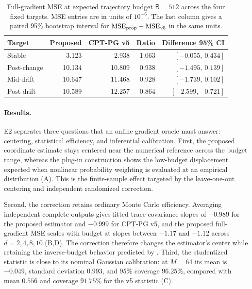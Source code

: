 \begin{table}[H]
\centering
\small
\caption{Full-gradient MSE at expected trajectory budget $\mathsf B=512$ across the four fixed targets.  MSE entries are in units of $10^{-6}$.  The last column gives a paired 95\% bootstrap interval for $\mathrm{MSE}_{\rm prop}-\mathrm{MSE}_{\rm v5}$ in the same units.}
\label{tab:e2-period-mse}
\begin{tabular}{lrrrr}
\toprule
Target & Proposed & CPT-PG v5 & Ratio & Difference 95\% CI \\
\midrule
Stable & 3.123 & 2.938 & 1.063 & $[-0.055,\ 0.434]$ \\
Post-change & 10.134 & 10.809 & 0.938 & $[-1.495,\ 0.139]$ \\
Mid-drift & 10.647 & 11.468 & 0.928 & $[-1.739,\ 0.102]$ \\
Post-drift & 10.589 & 12.257 & 0.864 & $[-2.599,-0.721]$ \\
\bottomrule
\end{tabular}
\end{table}
\FloatBarrier

\paragraph{Results.}
E2 separates three questions that an online gradient oracle must answer: centering, statistical efficiency, and inferential calibration.  First, the proposed coordinate estimate stays centered near the numerical reference across the budget range, whereas the plug-in construction shows the low-budget displacement expected when nonlinear probability weighting is evaluated at an empirical distribution (A).  This is the finite-sample effect targeted by the leave-one-out centering and independent randomized correction.

Second, the correction retains ordinary Monte Carlo efficiency.  Averaging independent complete outputs gives fitted trace-covariance slopes of $-0.989$ for the proposed estimator and $-0.999$ for CPT-PG v5, and the proposed full-gradient MSE scales with budget at slopes between $-1.17$ and $-1.12$ across $d=2,4,8,10$ (B,D).  The correction therefore changes the estimator's center while retaining the inverse-budget behavior predicted by .  Third, the studentized statistic is close to its nominal Gaussian calibration: at $M=64$ its mean is $-0.049$, standard deviation $0.993$, and 95\% coverage $96.25\%$, compared with mean $0.556$ and coverage $91.75\%$ for the v5 statistic (C).

